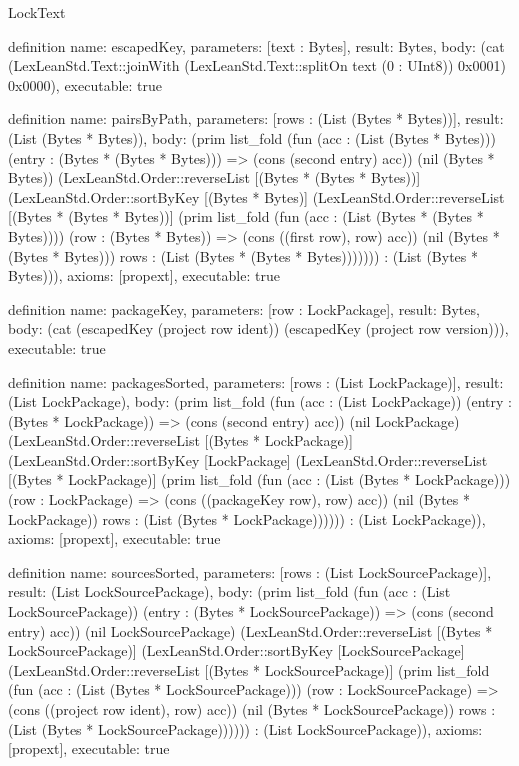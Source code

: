 \begin{lexlean}{LockText}
\begin{semanticmodule}
definition{
  name: escapedKey,
  parameters: [text : Bytes],
  result: Bytes,
  body: (cat (LexLeanStd.Text::joinWith (LexLeanStd.Text::splitOn text (0 : UInt8)) 0x0001) 0x0000),
  executable: true
}

definition{
  name: pairsByPath,
  parameters: [rows : (List (Bytes * Bytes))],
  result: (List (Bytes * Bytes)),
  body: (prim list_fold (fun (acc : (List (Bytes * Bytes))) (entry : (Bytes * (Bytes * Bytes))) => (cons (second entry) acc)) (nil (Bytes * Bytes)) (LexLeanStd.Order::reverseList [(Bytes * (Bytes * Bytes))] (LexLeanStd.Order::sortByKey [(Bytes * Bytes)] (LexLeanStd.Order::reverseList [(Bytes * (Bytes * Bytes))] (prim list_fold (fun (acc : (List (Bytes * (Bytes * Bytes)))) (row : (Bytes * Bytes)) => (cons ((first row), row) acc)) (nil (Bytes * (Bytes * Bytes))) rows : (List (Bytes * (Bytes * Bytes))))))) : (List (Bytes * Bytes))),
  axioms: [propext],
  executable: true
}

definition{
  name: packageKey,
  parameters: [row : LockPackage],
  result: Bytes,
  body: (cat (escapedKey (project row ident)) (escapedKey (project row version))),
  executable: true
}

definition{
  name: packagesSorted,
  parameters: [rows : (List LockPackage)],
  result: (List LockPackage),
  body: (prim list_fold (fun (acc : (List LockPackage)) (entry : (Bytes * LockPackage)) => (cons (second entry) acc)) (nil LockPackage) (LexLeanStd.Order::reverseList [(Bytes * LockPackage)] (LexLeanStd.Order::sortByKey [LockPackage] (LexLeanStd.Order::reverseList [(Bytes * LockPackage)] (prim list_fold (fun (acc : (List (Bytes * LockPackage))) (row : LockPackage) => (cons ((packageKey row), row) acc)) (nil (Bytes * LockPackage)) rows : (List (Bytes * LockPackage)))))) : (List LockPackage)),
  axioms: [propext],
  executable: true
}

definition{
  name: sourcesSorted,
  parameters: [rows : (List LockSourcePackage)],
  result: (List LockSourcePackage),
  body: (prim list_fold (fun (acc : (List LockSourcePackage)) (entry : (Bytes * LockSourcePackage)) => (cons (second entry) acc)) (nil LockSourcePackage) (LexLeanStd.Order::reverseList [(Bytes * LockSourcePackage)] (LexLeanStd.Order::sortByKey [LockSourcePackage] (LexLeanStd.Order::reverseList [(Bytes * LockSourcePackage)] (prim list_fold (fun (acc : (List (Bytes * LockSourcePackage))) (row : LockSourcePackage) => (cons ((project row ident), row) acc)) (nil (Bytes * LockSourcePackage)) rows : (List (Bytes * LockSourcePackage)))))) : (List LockSourcePackage)),
  axioms: [propext],
  executable: true
}


\end{semanticmodule}
\end{lexlean}
